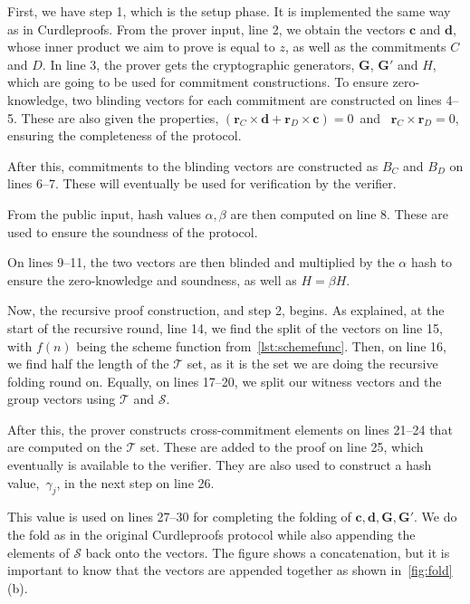 First, we have step 1, which is the setup phase.
It is implemented the same way as in Curdleproofs.
From the prover input, line 2, we obtain the vectors $\mathbf{c}$ and $\mathbf{d}$, whose inner product we aim to prove is equal to $z$, as well as the commitments $C$ and $D$.
In line 3, the prover gets the cryptographic generators, $\mathbf{G}$, $\mathbf{G}'$ and $H$, which are going to be used for commitment constructions.
To ensure zero-knowledge, two blinding vectors for each commitment are constructed on lines 4--5.
These are also given the properties, $(\mathbf{r}_C\times \mathbf{d}+\mathbf{r}_D\times \mathbf{c})=0$~and~ $\mathbf{r}_C\times\mathbf{r}_D=0$, ensuring the completeness of the protocol.

After this, commitments to the blinding vectors are constructed as $B_C$ and $B_D$ on lines 6--7.
These will eventually be used for verification by the verifier.

From the public input, hash values $\alpha,\beta$ are then computed on line 8.
These are used to ensure the soundness of the protocol.

On lines 9--11, the two vectors are then blinded and multiplied by the $\alpha$ hash to ensure the zero-knowledge and soundness, as well as $H=\beta H$.


Now, the recursive proof construction, and step 2, begins.
As explained, at the start of the recursive round, line 14, we find the split of the vectors on line 15, with $f(n)$ being the scheme function from~\autoref{lst:schemefunc}.
Then, on line 16, we find half the length of the $\mathbf{\mathcal{T}}$ set, as it is the set we are doing the recursive folding round on.
Equally, on lines 17--20, we split our witness vectors and the group vectors using $\mathbf{\mathcal{T}}$ and $\mathbf{\mathcal{S}}$.

After this, the prover constructs cross-commitment elements on lines 21--24 that are computed on the $\mathbf{\mathcal{T}}$ set.
These are added to the proof on line 25, which eventually is available to the verifier.
They are also used to construct a hash value,~$\gamma_j$, in the next step on line 26.

This value is used on lines 27--30 for completing the folding of $\mathbf{c},\mathbf{d},\mathbf{G},\mathbf{G'}$.
We do the fold as in the original Curdleproofs protocol while also appending the elements of $\mathbf{\mathcal{S}}$ back onto the vectors.
The figure shows a concatenation, but it is important to know that the vectors are appended together as shown in~\autoref{fig:fold}(b).

